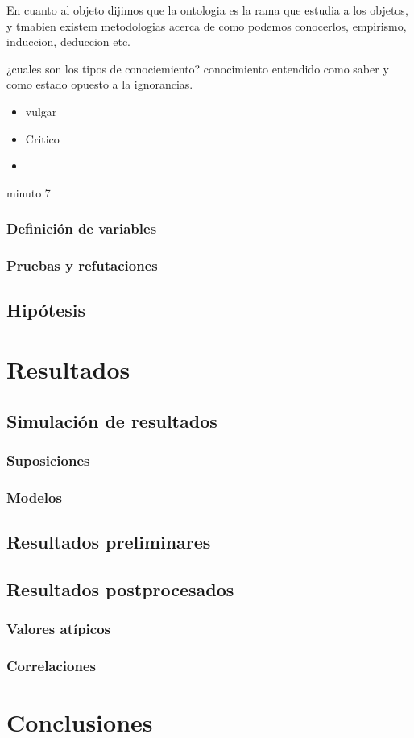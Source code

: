 \documentclass[12pt]{book}
\begin{document}
En cuanto al objeto dijimos que la ontologia es la rama que estudia a los objetos, y tmabien existem metodologias acerca de como podemos conocerlos, empirismo, induccion, deduccion etc.

¿cuales son los tipos de conociemiento? conocimiento entendido como saber y como estado opuesto a la ignorancias.

\begin{itemize}
\item vulgar
\item Critico
\item  
\end{itemize}

minuto 7
\subsection{Definición de variables}
\subsection{Pruebas y refutaciones}
\section{Hipótesis}
\chapter{Resultados}
\section{Simulación de resultados}
\subsection{Suposiciones}
\subsection{Modelos}
\section{Resultados preliminares}
\section{Resultados postprocesados}
\subsection{Valores atípicos}
\subsection{Correlaciones}
\chapter{Conclusiones}
\end{document}
